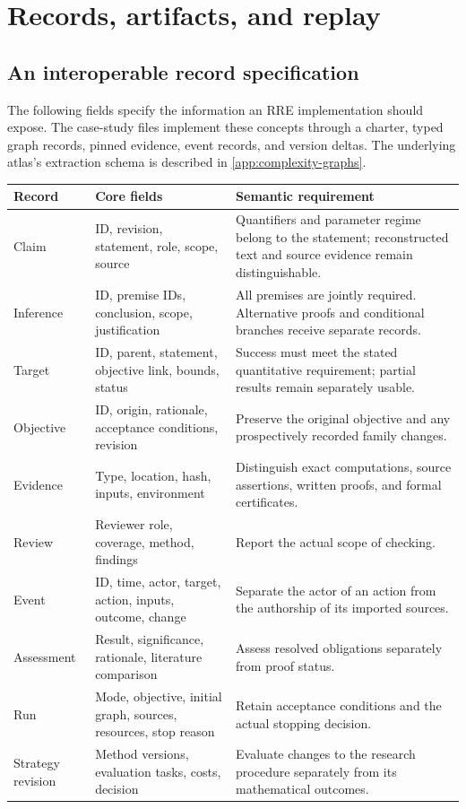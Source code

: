 \section{Records, artifacts, and replay}\label{app:records}

\subsection{An interoperable record specification}

The following fields specify the information an RRE implementation should expose. The case-study files implement these concepts through a charter, typed graph records, pinned evidence, event records, and version deltas. The underlying atlas's extraction schema is described in \cref{app:complexity-graphs}.

\begin{longtable}{@{}p{2.0cm}p{4.0cm}p{7.8cm}@{}}
\toprule
Record & Core fields & Semantic requirement \\
\midrule
\endhead
Claim & ID, revision, statement, role, scope, source & Quantifiers and parameter regime belong to the statement; reconstructed text and source evidence remain distinguishable. \\
Inference & ID, premise IDs, conclusion, scope, justification & All premises are jointly required. Alternative proofs and conditional branches receive separate records. \\
Target & ID, parent, statement, objective link, bounds, status & Success must meet the stated quantitative requirement; partial results remain separately usable. \\
Objective & ID, origin, rationale, acceptance conditions, revision & Preserve the original objective and any prospectively recorded family changes. \\
Evidence & Type, location, hash, inputs, environment & Distinguish exact computations, source assertions, written proofs, and formal certificates. \\
Review & Reviewer role, coverage, method, findings & Report the actual scope of checking. \\
Event & ID, time, actor, target, action, inputs, outcome, change & Separate the actor of an action from the authorship of its imported sources. \\
Assessment & Result, significance, rationale, literature comparison & Assess resolved obligations separately from proof status. \\
Run & Mode, objective, initial graph, sources, resources, stop reason & Retain acceptance conditions and the actual stopping decision. \\
Strategy revision & Method versions, evaluation tasks, costs, decision & Evaluate changes to the research procedure separately from its mathematical outcomes. \\
\bottomrule
\end{longtable}

